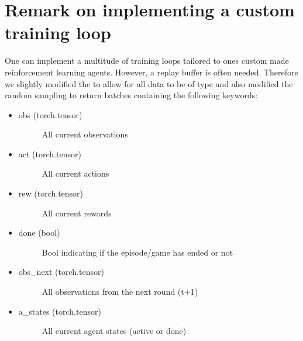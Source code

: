 \documentclass[letterpaper,10pt,english]{sphinxmanual}
\begin{document}
\section{Remark on implementing a custom training loop}
\label{\detokenize{UsingTheEnvironment:remark-on-implementing-a-custom-training-loop}}
\sphinxAtStartPar
One can implement a multitude of training loops tailored to ones custom made reinforcement learning agents.
However, a replay buffer is often needed. Therefore we slightly modified the  to allow
for all data to be of type  and also modified the random sampling to return batches containing the
following keywords:
\begin{itemize}
\item {} \begin{description}
\item[{obs (torch.tensor)}] \leavevmode
\sphinxAtStartPar
All current observations

\end{description}

\item {} \begin{description}
\item[{act (torch.tensor)}] \leavevmode
\sphinxAtStartPar
All current actions

\end{description}

\item {} \begin{description}
\item[{rew (torch.tensor)}] \leavevmode
\sphinxAtStartPar
All current rewards

\end{description}

\item {} \begin{description}
\item[{done (bool)}] \leavevmode
\sphinxAtStartPar
Bool indicating if the episode/game has ended or not

\end{description}

\item {} \begin{description}
\item[{obs\_next (torch.tensor)}] \leavevmode
\sphinxAtStartPar
All observations from the next round (t+1)

\end{description}

\item {} \begin{description}
\item[{a\_states (torch.tensor)}] \leavevmode
\sphinxAtStartPar
All current agent states (active or done)

\end{description}

\end{itemize}
\end{document}

